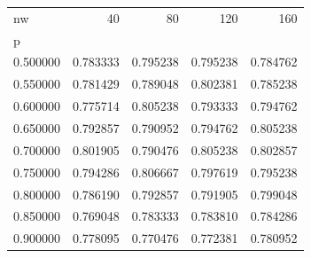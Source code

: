 \begin{tabular}{lrrrr}
\toprule
nw & 40 & 80 & 120 & 160 \\
p &  &  &  &  \\
\midrule
0.500000 & 0.783333 & 0.795238 & 0.795238 & 0.784762 \\
0.550000 & 0.781429 & 0.789048 & 0.802381 & 0.785238 \\
0.600000 & 0.775714 & 0.805238 & 0.793333 & 0.794762 \\
0.650000 & 0.792857 & 0.790952 & 0.794762 & 0.805238 \\
0.700000 & 0.801905 & 0.790476 & 0.805238 & 0.802857 \\
0.750000 & 0.794286 & 0.806667 & 0.797619 & 0.795238 \\
0.800000 & 0.786190 & 0.792857 & 0.791905 & 0.799048 \\
0.850000 & 0.769048 & 0.783333 & 0.783810 & 0.784286 \\
0.900000 & 0.778095 & 0.770476 & 0.772381 & 0.780952 \\
\bottomrule
\end{tabular}
